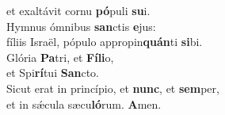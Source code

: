 \oddverse et exaltávit cornu \textbf{pó}puli \textbf{su}i.\\
\evenverse Hymnus ómnibus \textbf{san}ctis \textbf{e}jus:~\*\\
\evenverse fíliis Israël, pópulo appropin\textbf{quán}ti \textbf{si}bi.\\
\oddverse Glória \textbf{Pa}tri, et \textbf{Fí}\textbf{li}o,~\*\\
\oddverse et Spi\textbf{rí}tui \textbf{San}cto.\\
\evenverse Sicut erat in princípio, et \textbf{nunc}, et \textbf{sem}per,~\*\\
\evenverse et in sǽcula sæcu\textbf{ló}rum. \textbf{A}men.\\
